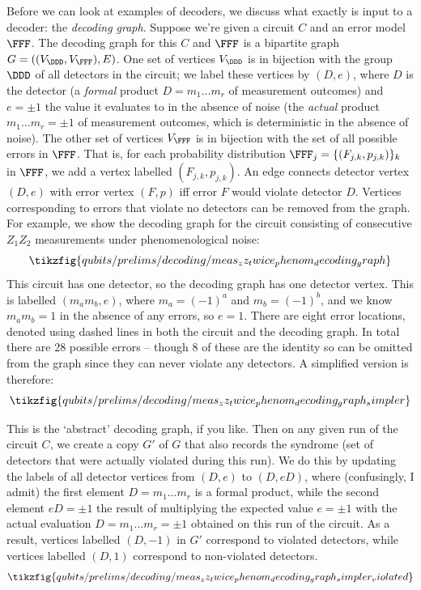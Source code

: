 Before we can look at examples of decoders, we discuss what exactly is input to a decoder: the \textit{decoding graph}.
Suppose we're given a circuit $C$ and an error model $\FFF$.
The decoding graph for this $C$ and $\FFF$ is a bipartite graph $G = ((V_\DDD, V_\FFF), E)$.
One set of vertices $V_\DDD$ is in bijection with the group $\DDD$ of all detectors in the circuit; we label these vertices by $(D, e)$, where $D$ is the detector (a \textit{formal} product $D = m_1 \ldots m_r$ of measurement outcomes) and $e = \pm 1$ the value it evaluates to in the absence of noise (the \textit{actual} product $m_1 \ldots m_r = \pm 1$ of measurement outcomes, which is deterministic in the absence of noise).
The other set of vertices $V_\FFF$ is in bijection with the set of all possible errors in $\FFF$.
That is, for each probability distribution $\FFF_j = \{(F_{j,k}, p_{j,k})\}_k$ in $\FFF$, we add a vertex labelled $(F_{j,k}, p_{j,k})$.
An edge connects detector vertex $(D, e)$ with error vertex $(F, p)$ iff error $F$ would violate detector $D$.
Vertices corresponding to errors that violate no detectors can be removed from the graph.
For example, we show the decoding graph for the circuit consisting of consecutive $Z_1 Z_2$ measurements under phenomenological noise:
\begin{equation*}
    \tikzfig{qubits/prelims/decoding/meas_zz_twice_phenom_decoding_graph}
\end{equation*}
This circuit has one detector, so the decoding graph has one detector vertex.
This is labelled $(m_a m_b, e)$, where $m_a = (-1)^a$ and $m_b = (-1)^b$, and we know $m_a m_b = 1$ in the absence of any errors, so $e = 1$.
There are eight error locations, denoted using dashed lines in both the circuit and the decoding graph.
In total there are 28 possible errors -- though 8 of these are the identity so can be omitted from the graph since they can never violate any detectors.
A simplified version is therefore:
\begin{equation}
    \tikzfig{qubits/prelims/decoding/meas_zz_twice_phenom_decoding_graph_simpler}
\end{equation}

This is the `abstract' decoding graph, if you like.
Then on any given run of the circuit $C$, we create a copy $G'$ of $G$ that also records the syndrome (set of detectors that were actually violated during this run).
We do this by updating the labels of all detector vertices from $(D, e)$ to $(D, eD)$, where (confusingly, I admit) the first element $D = m_1 \ldots m_r$ is a formal product, while the second element $eD = \pm 1$ the result of multiplying the expected value $e = \pm 1$ with the actual evaluation $D = m_1 \ldots m_r = \pm 1$ obtained on this run of the circuit.
As a result, vertices labelled $(D, -1)$ in $G'$ correspond to violated detectors, while vertices labelled $(D, 1)$ correspond to non-violated detectors.
\begin{equation}
    \tikzfig{qubits/prelims/decoding/meas_zz_twice_phenom_decoding_graph_simpler_violated}
\end{equation}

